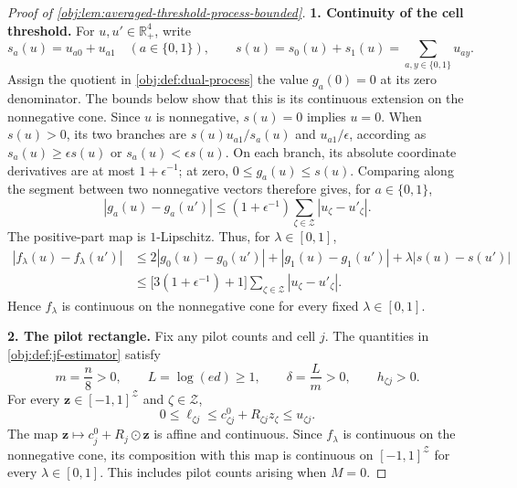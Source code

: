 \documentclass[11pt]{article}
\begin{document}
\begin{proof}[Proof of \cref{obj:lem:averaged-threshold-process-bounded}]
\noindent\textbf{1. Continuity of the cell threshold.}
For \(u,u'\in\mathbb R_+^4\), write
\[
s_a(u)=u_{a0}+u_{a1}\quad(a\in\{0,1\}),
\qquad
s(u)=s_0(u)+s_1(u)=\sum_{a,y\in\{0,1\}}u_{ay}.
\]
Assign the quotient in \cref{obj:def:dual-process} the value \(g_a(0)=0\) at its zero denominator. The bounds below show that this is its continuous extension on the nonnegative cone. Since \(u\) is nonnegative, \(s(u)=0\) implies \(u=0\). When \(s(u)>0\), its two branches are \(s(u)u_{a1}/s_a(u)\) and \(u_{a1}/\epsilon\), according as \(s_a(u)\geq\epsilon s(u)\) or \(s_a(u)<\epsilon s(u)\). On each branch, its absolute coordinate derivatives are at most \(1+\epsilon^{-1}\); at zero, \(0\leq g_a(u)\leq s(u)\). Comparing along the segment between two nonnegative vectors therefore gives, for \(a\in\{0,1\}\),
\[
|g_a(u)-g_a(u')|
\leq(1+\epsilon^{-1})\sum_{\zeta\in\mathcal Z}|u_\zeta-u'_\zeta|.
\]
The positive-part map is \(1\)-Lipschitz. Thus, for \(\lambda\in[0,1]\),
\[
\begin{aligned}
|f_\lambda(u)-f_\lambda(u')|
&\leq 2|g_0(u)-g_0(u')|
   +|g_1(u)-g_1(u')|
   +\lambda|s(u)-s(u')|\\
&\leq \bigl[3(1+\epsilon^{-1})+1\bigr]
       \sum_{\zeta\in\mathcal Z}|u_\zeta-u'_\zeta|.
\end{aligned}
\]
Hence \(f_\lambda\) is continuous on the nonnegative cone for every fixed \(\lambda\in[0,1]\).

\noindent\textbf{2. The pilot rectangle.}
Fix any pilot counts and cell \(j\). The quantities in \cref{obj:def:jf-estimator} satisfy
\[
m=\frac n8>0,\qquad L=\log(ed)\geq1,\qquad
\delta=\frac Lm>0,\qquad h_{\zeta j}>0.
\]
For every \(\boldsymbol z\in[-1,1]^{\mathcal Z}\) and \(\zeta\in\mathcal Z\),
\[
0\leq\ell_{\zeta j}
\leq c^0_{\zeta j}+R_{\zeta j}z_\zeta
\leq u_{\zeta j}.
\]
The map \(\boldsymbol z\mapsto c_j^0+R_j\odot\boldsymbol z\) is affine and continuous. Since \(f_\lambda\) is continuous on the nonnegative cone, its composition with this map is continuous on \([-1,1]^{\mathcal Z}\) for every \(\lambda\in[0,1]\). This includes pilot counts arising when \(M=0\).


\end{proof}
\end{document}

